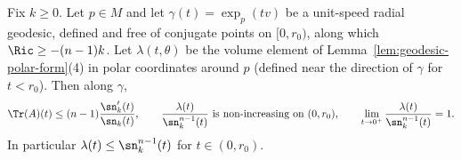 \begin{lemma}
\label{lem:volume-element-comparison}
Fix $k\ge0$. Let $p\in M$ and let $\gamma(t)=\exp_p(tv)$ be a
unit-speed radial geodesic, defined and free of conjugate points on
$[0,r_0)$, along which $\Ric\ge-(n-1)k$. Let $\lambda(t,\theta)$ be
the volume element of Lemma~\ref{lem:geodesic-polar-form}(4) in
polar coordinates around $p$ (defined near the direction of
$\gamma$ for $t<r_0$). Then along $\gamma$,
$$\Tr(A)(t)\le(n-1)\frac{\sn_k'(t)}{\sn_k(t)},\qquad
\frac{\lambda(t)}{\sn_k^{n-1}(t)}\ \text{is non-increasing on
}(0,r_0),\qquad \lim_{t\to0^+}\frac{\lambda(t)}{\sn_k^{n-1}(t)}=1.$$
In particular $\lambda(t)\le\sn_k^{n-1}(t)$ for $t\in(0,r_0)$.
\end{lemma}

